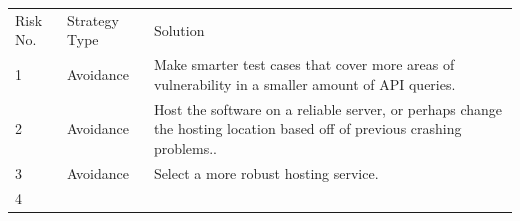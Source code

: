 \documentclass[]{article}
\begin{document}
\begin{longtable}[c]{@{}lll@{}}
\toprule\addlinespace
\begin{minipage}[t]{0.30\columnwidth}\raggedright
Risk No.
\end{minipage} & \begin{minipage}[t]{0.30\columnwidth}\raggedright
Strategy Type
\end{minipage} & \begin{minipage}[t]{0.30\columnwidth}\raggedright
Solution
\end{minipage}
\\\addlinespace
\begin{minipage}[t]{0.30\columnwidth}\raggedright
1
\end{minipage} & \begin{minipage}[t]{0.30\columnwidth}\raggedright
Avoidance
\end{minipage} & \begin{minipage}[t]{0.30\columnwidth}\raggedright
Make smarter test cases that cover more areas of vulnerability in a
smaller amount of API queries.
\end{minipage}
\\\addlinespace
\begin{minipage}[t]{0.30\columnwidth}\raggedright
2
\end{minipage} & \begin{minipage}[t]{0.30\columnwidth}\raggedright
Avoidance
\end{minipage} & \begin{minipage}[t]{0.30\columnwidth}\raggedright
Host the software on a reliable server, or perhaps change the hosting
location based off of previous crashing problems..
\end{minipage}
\\\addlinespace
\begin{minipage}[t]{0.30\columnwidth}\raggedright
3
\end{minipage} & \begin{minipage}[t]{0.30\columnwidth}\raggedright
Avoidance
\end{minipage} & \begin{minipage}[t]{0.30\columnwidth}\raggedright
Select a more robust hosting service.
\end{minipage}
\\\addlinespace
\begin{minipage}[t]{0.30\columnwidth}\raggedright
4
\end{minipage} & \begin{minipage}[t]{0.30\columnwidth}\raggedright

\end{minipage}
\end{longtable}
\end{document}

